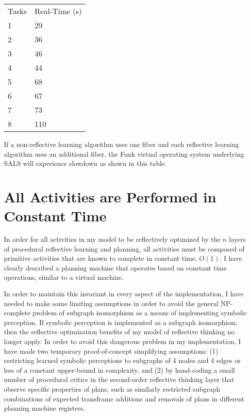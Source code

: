\vspace{5mm}
\begin{tabular}{ll}
Tasks & Real-Time (s) \\
1 & 29\\
2 & 36\\
3 & 46\\
4 & 44\\
5 & 68\\
6 & 67\\
7 & 73\\
8 & 110\\
\end{tabular}
\vspace{5mm}

If a non-reflective learning algorithm uses one fiber and each
reflective learning algorithm uses an additional fiber, the Funk
virtual operating system underlying SALS will experience slowdown as
shown in this table.

\section{All Activities are Performed in Constant Time}

In order for all activities in my model to be reflectively optimized
by the $n$ layers of procedural reflective learning and planning, all
activities must be composed of primitive activities that are known to
complete in constant time, $O(1)$.  I have clearly described a
planning machine that operates based on constant time operations,
similar to a virtual machine.

In order to maintain this invariant in every aspect of the
implementation, I have needed to make some limiting assumptions in
order to avoid the general NP-complete problem of subgraph isomorphism
as a means of implementing symbolic perception.  If symbolic
perception is implemented as a subgraph isomorphism, then the
reflective optimization benefits of my model of reflective thinking no
longer apply.  In order to avoid this dangerous problem in my
implementation, I have made two temporary proof-of-concept simplifying
assumptions: (1) restricting learned symbolic perceptions to subgraphs
of 4 nodes and 4 edges or less of a constant upper-bound in
complexity, and (2) by hand-coding a small number of procedural
critics in the second-order reflective thinking layer that observe
specific properties of plans, such as similarly restricted subgraph
combinations of expected transframe additions and removals of plans in
different planning machine registers.

